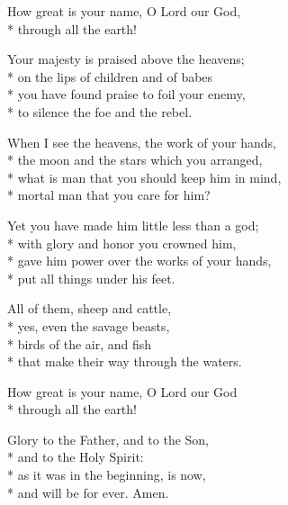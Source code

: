 How great is your name, O Lord our God, \\*
through all the earth!

Your majesty is praised above the heavens; \\*
on the lips of children and of babes\\*
you have found praise to foil your enemy, \\*
to silence the foe and the rebel.

When I see the heavens, the work of your hands, \\*
the moon and the stars which you arranged,\\*
what is man that you should keep him in mind, \\*
mortal man that you care for him?

Yet you have made him little less than a god; \\*
with glory and honor you crowned him,\\*
gave him power over the works of your hands, \\*
put all things under his feet.

All of them, sheep and cattle, \\*
yes, even the savage beasts,\\*
birds of the air, and fish \\*
that make their way through the waters.

How great is your name, O Lord our God \\*
through all the earth!

Glory to the Father, and to the Son, \\*
and to the Holy Spirit:\\*
as it was in the beginning, is now, \\*
and will be for ever. Amen.
